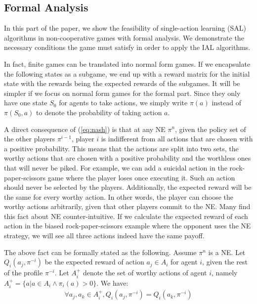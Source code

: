 \documentclass[a4paper]{article}
\begin{document}
\begin{multicols}{2}
\section{Formal Analysis}
In this part of the paper, we show the feasibility of single-action learning (SAL) algorithms in non-cooperative games with formal analysis. We demonstrate the necessary conditions the game must satisfy in order to apply the IAL algorithms.

In fact, finite games can be translated into normal form games. If we encapsulate the following states as a subgame, we end up with a reward matrix for the initial state with the rewards being the expected rewards of the subgames. It will be simpler if we focus on normal form games for the formal part. Since they only have one state $S_0$ for agents to take actions, we simply write $\pi(a)$ instead of $\pi(S_0, a)$ to denote the probability of taking action $a$.

A direct consequence of (\ref{eq:nash}) is that at any NE $\pi^n$, given the policy set of the other players $\pi^{i-1}$, player $i$ is indifferent from all actions that are chosen with a positive probability. This means that the actions are split into two sets, the worthy actions that are chosen with a positive probability and the worthless ones that will never be piked. For example, we can add a suicidal action in the rock-paper-scissors game where the player loses once executing it. Such an action should never be selected by the players. Additionally, the expected reward will be the same for every worthy action. In other words, the player can choose the worthy actions arbitrarily, given that other players commit to the NE. Many find this fact about NE counter-intuitive. If we calculate the expected reward of each action in the biased rock-paper-scissors example where the opponent uses the NE strategy, we will see all three actions indeed have the same payoff.

The above fact can be formally stated as the following. Assume $\pi^n$ is a NE. Let $Q_i(a_j, \pi^{-i})$ be the expected reward of action $a_j \in A_i$ for agent $i$, given the rest of the profile $\pi^{-i}$. Let $A^+_i$ denote the set of worthy actions of agent $i$, namely $A^+_i = \{a | a \in A_i \wedge \pi_i(a) > 0 \}$. We have:
\begin{equation}
\begin{aligned}
\forall a_j, a_k \in A^+_i, Q_i(a_j, \pi^{-i}) = Q_i(a_k, \pi^{-i})
\label{eq:nash_indifferent}
\end{aligned}
\end{equation}


\end{multicols}
\end{document}
